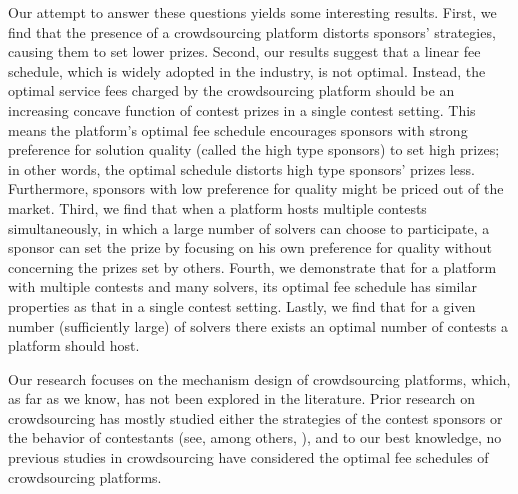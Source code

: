 \documentclass[12pt]{article}
\begin{document}
Our attempt to answer these questions yields some interesting results. First, we find that the presence of a crowdsourcing platform distorts sponsors' strategies, causing them to set lower prizes. Second, our results suggest that a linear fee schedule, which is widely adopted in the industry, is not optimal. Instead, the optimal service fees charged by the crowdsourcing platform should be an increasing concave function of contest prizes in a single contest setting. This means the platform's optimal fee schedule encourages sponsors with strong preference for solution quality (called the high type sponsors) to set high prizes; in other words, the optimal schedule distorts high type sponsors' prizes less. Furthermore, sponsors with low preference for quality might be priced out of the market. Third, we find that when a platform hosts multiple contests simultaneously, in which a large number of solvers can choose to participate, a sponsor can set the prize by focusing on his own preference for quality without concerning the prizes set by others. Fourth, we demonstrate that for a platform with multiple contests and many solvers, its optimal fee schedule has similar properties as that in a single contest setting. Lastly, we find that for a given number (sufficiently large) of solvers there exists an optimal number of contests a platform should host.

Our research focuses on the mechanism design of crowdsourcing platforms, which, as far as we know, has not been explored in the literature. Prior research on crowdsourcing has mostly studied either the strategies
of the contest sponsors or the behavior of contestants (see, among
others, \citep{Archak:2009, Chawla:2011, Ghosh:2012, Huang:2013, Liu:2013}),
and to our best knowledge, no previous studies in crowdsourcing have
considered the optimal fee schedules of crowdsourcing platforms.
\end{document}
